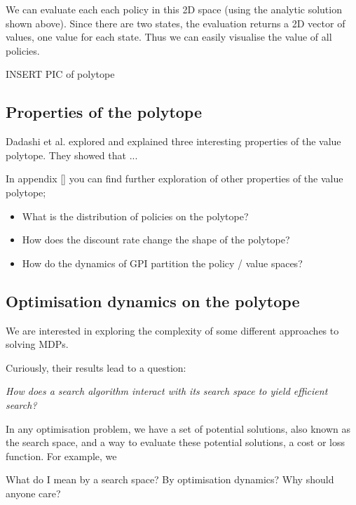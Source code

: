 We can evaluate each each policy in this 2D space (using the analytic solution shown above).
Since there are two states, the evaluation returns a 2D vector of values, one value for each state.
Thus we can easily visualise the value of all policies.

{\color{red}INSERT PIC of polytope}

\subsection{Properties of the polytope}

Dadashi et al. explored and explained three interesting properties
of the value polytope. \cite{Dadashi2018}
{\color{red}They showed that ...}

In appendix [] you can find further exploration of other properties of the value polytope;
\begin{itemize}
\tightlist
\item
  What is the distribution of policies on the polytope?
\item
  How does the discount rate change the shape of the polytope?
\item
  How do the dynamics of GPI partition the policy / value spaces?
\end{itemize}


\subsection{Optimisation dynamics on the polytope}

We are interested in exploring the complexity of some different approaches to solving MDPs.

Curiously, their results lead to a question:

\begin{displayquote}
  \textit{How does a search algorithm interact with its search space to yield efficient search?}
\end{displayquote}

In any optimisation problem, we have a set of potential solutions, also known as the search space,
and a way to evaluate these potential solutions, a cost or loss function. For example, we

What do I mean by a search space? By optimisation dynamics? Why should anyone care?


